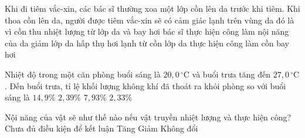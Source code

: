	\begin{ex}%
		Khi đi tiêm vắc-xin, các bác sĩ thường xoa một lớp cồn lên da trước khi tiêm. Khi thoa cồn lên da, người được tiêm vắc-xin sẽ có cảm giác lạnh trên vùng da đó là vì
		\choice
		{\True cồn thu nhiệt lượng từ lớp da và bay hơi}
		{bác sĩ thực hiện công làm nội năng của da giảm}
		{lớp da hấp thụ hơi lạnh từ cồn}
		{lớp da thực hiện công làm cồn bay hơi}
	\end{ex}

	\begin{ex}%
		Nhiệt độ trong một căn phòng buổi sáng là $20{,}0\,^\circ\text{C}$ và buổi trưa tăng đến $27{,}0\,^\circ\text{C}$. Đến buổi trưa, tỉ lệ khối lượng không khí đã thoát ra khỏi phòng so với buổi sáng là
		\choice
		{$14{,}9\%$}
		{$2{,}39\%$}
		{$7{,}93\%$}
		{\True $2{,}33\%$}
	\end{ex}

	\begin{ex}%
		Nội năng của vật sẽ như thế nào nếu vật truyền nhiệt lượng và thực hiện công?
		\choice
		{Chưa đủ điều kiện để kết luận}
		{Tăng}
		{\True Giảm}
		{Không đổi}
	\end{ex}

